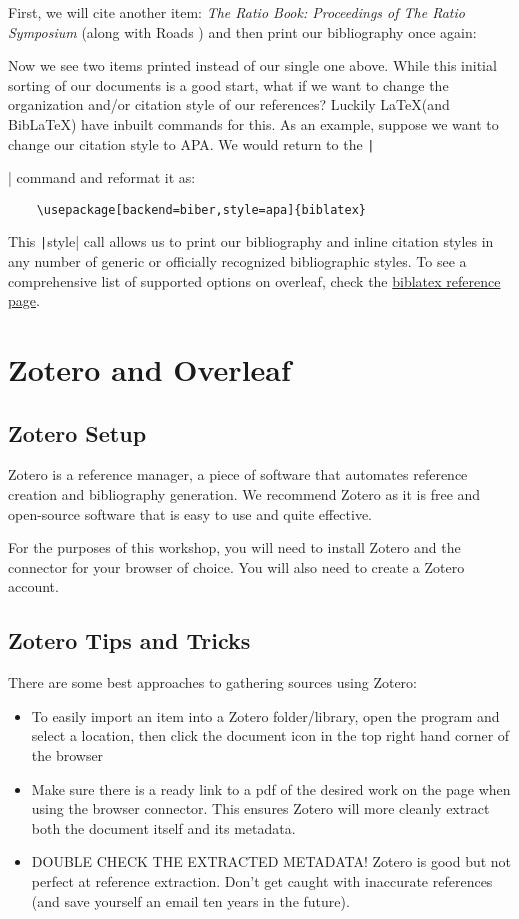 \documentclass{article}
\begin{document}
First, we will cite another item: \textit{The Ratio Book: Proceedings of The Ratio Symposium} \cite{ratiobook} (along with Roads \cite{microsound}) and then print our bibliography once again:
\printbibliography[segment=2]

Now we see two items printed instead of our single one above. While this initial sorting of our documents is a good start, what if we want to change the organization and/or citation style of our references? Luckily \LaTeX \space (and BibLaTeX) have inbuilt commands for this.
As an example, suppose we want to change our citation style to APA. We would return to the \texttt|\usepackage[backend=biber]{biblatex}| command and reformat it as: 
\begin{verbatim}
    \usepackage[backend=biber,style=apa]{biblatex}
\end{verbatim}
This \texttt|style| call allows us to print our bibliography and inline citation styles in any number of generic or officially recognized bibliographic styles. To see a comprehensive list of supported options on overleaf, check the \href{https://www.overleaf.com/learn/latex/Biblatex_bibliography_styles}{biblatex reference page}.

\newrefsegment
\section{Zotero and Overleaf}
\subsection{Zotero Setup}
Zotero is a reference manager, a piece of software that automates reference creation and bibliography generation. We recommend Zotero as it is free and open-source software that is easy to use and quite effective.

For the purposes of this workshop, you will need to install Zotero and the connector for your browser of choice. You will also need to create a Zotero account.
\subsection{Zotero Tips and Tricks}
There are some best approaches to gathering sources using Zotero:
\begin{itemize}
    \item To easily import an item into a Zotero folder/library, open the program and select a location, then click the document icon in the top right hand corner of the browser
    \item Make sure there is a ready link to a pdf of the desired work on the page when using the browser connector. This ensures Zotero will more cleanly extract both the document itself and its metadata.
    \item DOUBLE CHECK THE EXTRACTED METADATA! Zotero is good but not perfect at reference extraction. Don't get caught with inaccurate references (and save yourself an email ten years in the future).
\end{itemize}
\end{document}
